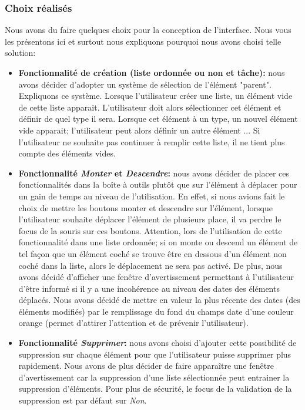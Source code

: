 \documentclass[a4paper,10pt]{article}
\begin{document}
\subsubsection{Choix réalisés}
Nous avons du faire quelques choix pour la conception de l'interface. Nous vous les présentons ici et surtout nous expliquons pourquoi nous avons choisi telle solution:
\begin{itemize}
\item \textbf{Fonctionnalité de création (liste ordonnée ou non et tâche):} nous avons décider d'adopter un système de sélection de l'élément "parent". Expliquons ce système. Lorsque l'utilisateur créer une liste, un élément vide de cette liste apparait. L'utilisateur doit alors sélectionner cet élément et définir de quel type il sera. Lorsque cet élément à un type, un nouvel élément vide apparait; l'utilisateur peut alors définir un autre élément ... Si l'utilisateur ne souhaite pas continuer à remplir cette liste, il ne tient plus compte des éléments vides.
\item \textbf{Fonctionnalité \textit{Monter} et \textit{Descendre}:} nous avons décider de placer ces fonctionnalités dans la boîte à outils plutôt que sur l'élément à déplacer pour un gain de temps au niveau de l'utilisation. En effet, si nous avions fait le choix de mettre les boutons monter et descendre sur l'élément, lorsque l'utilisateur souhaite déplacer l'élément de plusieurs place, il va perdre le focus de la souris sur ces boutons. Attention, lors de l'utilisation de cette fonctionnalité dans une liste ordonnée; si on monte ou descend un élément de tel façon que un élément coché se trouve être en dessous d'un élément non coché dans la liste, alors le déplacement ne sera pas activé.
De plus, nous avons décidé d'afficher une fenêtre d'avertissement permettant à l'utilisateur d'être informé si il y a une incohérence au niveau des dates des éléments déplacés. Nous avons décidé de mettre en valeur la plus récente des dates (des éléments modifiés) par le remplissage du fond du champs date d'une couleur orange (permet d'attirer l'attention et de prévenir l'utilisateur).
\item \textbf{Fonctionnalité \textit{Supprimer}:} nous avons choisi d'ajouter cette possibilité de suppression sur chaque élément pour que l'utilisateur puisse supprimer plus rapidement. Nous avons de plus décider de faire apparaître une fenêtre d'avertissement car la suppression d'une liste sélectionnée peut entrainer la suppression d'éléments. Pour plus de sécurité, le focus de la validation de la suppression est par défaut sur \textit{Non}.

\end{itemize}
\end{document}
